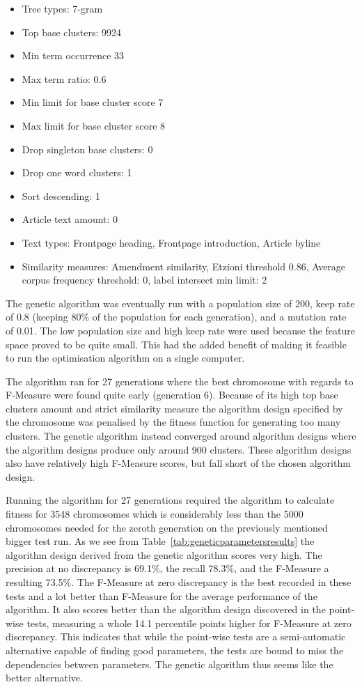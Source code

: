 \begin{itemize}
  \item Tree types: 7-gram
  \item Top base clusters: 9924
  \item Min term occurrence 33
  \item Max term ratio: 0.6
  \item Min limit for base cluster score 7
  \item Max limit for base cluster score 8
  \item Drop singleton base clusters: 0
  \item Drop one word clusters: 1
  \item Sort descending: 1
  \item Article text amount: 0
  \item Text types: Frontpage heading, Frontpage introduction, Article byline
  \item Similarity measures: Amendment similarity, Etzioni threshold 0.86, Average corpus frequency threshold: 0, label intersect min limit: 2
\end{itemize}

The genetic algorithm was eventually run with a population size of 200, keep rate of 0.8 (keeping 80\% of the population for each generation), and a mutation rate of 0.01. The low population size and high keep rate were used because the feature space proved to be quite small. This had the added benefit of making it feasible to run the optimisation algorithm on a single computer.

The algorithm ran for 27 generations where the best chromosome with regards to F-Measure were found quite early (generation 6). Because of its high top base clusters amount and strict similarity measure the algorithm design specified by the chromosome was penalised by the fitness function for generating too many clusters. The genetic algorithm instead converged around algorithm designs where the algorithm designs produce only around 900 clusters. These algorithm designs also have relatively high F-Measure scores, but fall short of the chosen algorithm design.

Running the algorithm for 27 generations required the algorithm to calculate fitness for 3548 chromosomes which is considerably less than the 5000 chromosomes needed for the zeroth generation on the previously mentioned bigger test run. As we see from Table~\ref{tab:geneticparametersresults} the algorithm design derived from the genetic algorithm scores very high. The precision at no discrepancy is 69.1\%, the recall 78.3\%, and the F-Measure a resulting 73.5\%. The F-Measure at zero discrepancy is the best recorded in these tests and a lot better than F-Measure for the average performance of the algorithm. It also scores better than the algorithm design discovered in the point-wise tests, measuring a whole 14.1 percentile points higher for F-Measure at zero discrepancy. This indicates that while the point-wise tests are a semi-automatic alternative capable of finding good parameters, the tests are bound to miss the dependencies between parameters. The genetic algorithm thus seems like the better alternative.

